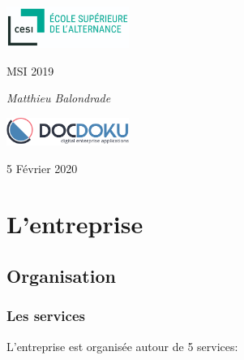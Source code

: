 \documentclass[11pt]{report}
\title{\Huge \color{burntorange}{Dossier entreprise Docdoku}}
\author{\Large Matthieu \bsc{Balondrade} \\ MSI 2019 }
\date{\Large 5 Février 2020}
\begin{document}
\begin{titlepage}
	\centering
	\includegraphics[width=0.3\textwidth]{cesi.png}\par\vspace{1cm}
	{\scshape\Large MSI 2019\par}
	\vspace{3cm}
	{\huge\bfseries \color{burntorange}{Dossier entreprise}\par}
	\vspace{2cm}
	{\Large\itshape Matthieu Balondrade\par}\vspace{2cm}
	\vfill

	\includegraphics[width=0.3\textwidth]{docdoku.png}\par\vspace{2cm}\par
	{\large 5 Février 2020\par}


\end{titlepage}
\tableofcontents

\part{L'entreprise}

	\chapter{Organisation}

		\section{Les services}

			L'entreprise est organisée autour de 5 services:\\
\end{document}

